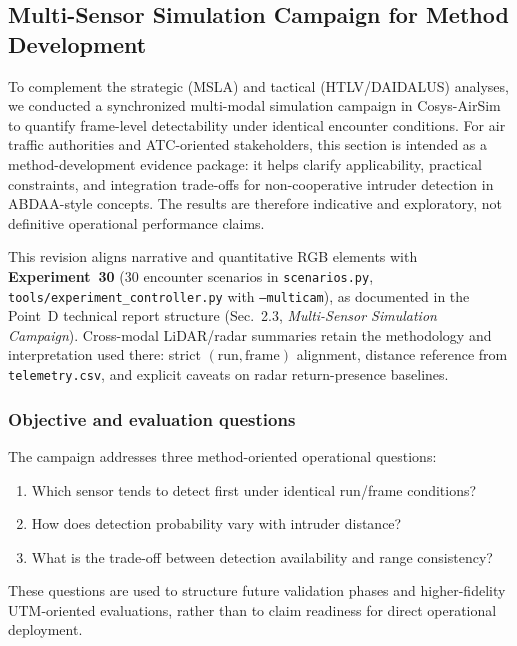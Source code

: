 \subsection{Multi-Sensor Simulation Campaign for Method Development}
\label{sec:multisensor-benchmark}

To complement the strategic (MSLA) and tactical (HTLV/DAIDALUS) analyses, we conducted a synchronized multi-modal simulation campaign in Cosys-AirSim to quantify frame-level detectability under identical encounter conditions. For air traffic authorities and ATC-oriented stakeholders, this section is intended as a method-development evidence package: it helps clarify applicability, practical constraints, and integration trade-offs for non-cooperative intruder detection in ABDAA-style concepts. The results are therefore indicative and exploratory, not definitive operational performance claims.

This revision aligns narrative and quantitative RGB elements with \textbf{Experiment~30} (30 encounter scenarios in \texttt{scenarios.py}, \texttt{tools/experiment\_controller.py} with \texttt{--multicam}), as documented in the Point~D technical report structure (Sec.~2.3, \emph{Multi-Sensor Simulation Campaign}). Cross-modal LiDAR/radar summaries retain the methodology and interpretation used there: strict $(\mathrm{run},\mathrm{frame})$ alignment, distance reference from \texttt{telemetry.csv}, and explicit caveats on radar return-presence baselines.

\subsubsection{Objective and evaluation questions}
The campaign addresses three method-oriented operational questions:
\begin{enumerate}
  \item Which sensor tends to detect first under identical run/frame conditions?
  \item How does detection probability vary with intruder distance?
  \item What is the trade-off between detection availability and range consistency?
\end{enumerate}
These questions are used to structure future validation phases and higher-fidelity UTM-oriented evaluations, rather than to claim readiness for direct operational deployment.

